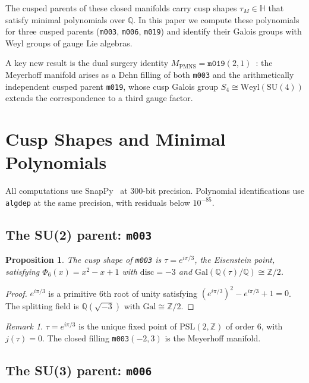 \documentclass[11pt,a4paper]{article}
\newtheorem{proposition}[theorem]{Proposition}
\theoremstyle{definition}
\theoremstyle{remark}
\newtheorem{remark}[theorem]{Remark}
\newcommand{\Z}{\mathbb{Z}}
\newcommand{\Q}{\mathbb{Q}}
\newcommand{\mfld}[1]{\texttt{#1}}
\newcommand{\Gal}{\mathrm{Gal}}
\newcommand{\SU}{\mathrm{SU}}
\newcommand{\Weyl}{\mathrm{Weyl}}
\newcommand{\disc}{\mathrm{disc}}
\begin{document}
The cusped parents of these closed manifolds carry cusp shapes
$\tau_M\in\mathbb{H}$ that satisfy minimal polynomials over $\Q$.
In this paper we compute these polynomials for three cusped parents
(\mfld{m003}, \mfld{m006}, \mfld{m019}) and identify their Galois
groups with Weyl groups of gauge Lie algebras.

A key new result is the dual surgery identity
$M_{\mathrm{PMNS}}=\mfld{m019}(2,1)$~\cite{GentryDual}:
the Meyerhoff manifold arises as a Dehn filling of both
\mfld{m003} and the arithmetically independent cusped parent
\mfld{m019}, whose cusp Galois group $S_4\cong\Weyl(\SU(4))$
extends the correspondence to a third gauge factor.

\section{Cusp Shapes and Minimal Polynomials}

All computations use SnapPy~\cite{SnapPy} at 300-bit precision.
Polynomial identifications use \texttt{algdep} at the same
precision, with residuals below $10^{-85}$.

\subsection{The SU(2) parent: \mfld{m003}}

\begin{proposition}\label{prop:m003}
The cusp shape of \mfld{m003} is $\tau = e^{i\pi/3}$,
the Eisenstein point, satisfying $\Phi_6(x)=x^2-x+1$
with $\disc=-3$ and $\Gal(\Q(\tau)/\Q)\cong\Z/2$.
\end{proposition}

\begin{proof}
$e^{i\pi/3}$ is a primitive 6th root of unity satisfying
$(e^{i\pi/3})^2-e^{i\pi/3}+1=0$.
The splitting field is $\Q(\sqrt{-3})$ with $\Gal\cong\Z/2$.
\end{proof}

\begin{remark}
$\tau=e^{i\pi/3}$ is the unique fixed point of
$\mathrm{PSL}(2,\Z)$ of order $6$, with $j(\tau)=0$.
The closed filling \mfld{m003}$(-2,3)$ is the Meyerhoff manifold.
\end{remark}

\subsection{The SU(3) parent: \mfld{m006}}
\end{document}
